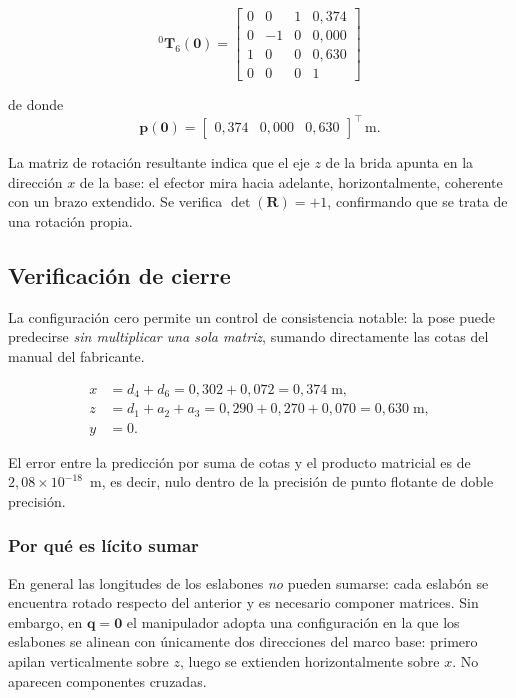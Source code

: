 \documentclass[11pt,a4paper]{article}
\newcommand{\T}[2]{{}^{#1}\mathbf{T}_{#2}}
\newcommand{\mat}[1]{\mathbf{#1}}
\begin{document}
\begin{equation}
\T{0}{6}(\mat{0}) =
\begin{bmatrix}
0 & 0 & 1 & 0{,}374\\
0 & -1 & 0 & 0{,}000\\
1 & 0 & 0 & 0{,}630\\
0 & 0 & 0 & 1
\end{bmatrix}
\end{equation}

de donde
\begin{equation}
\mat{p}(\mat{0}) = \begin{bmatrix}0{,}374 & 0{,}000 & 0{,}630\end{bmatrix}^{\top}\,\mathrm{m}.
\end{equation}

La matriz de rotación resultante indica que el eje $z$ de la brida
apunta en la dirección $x$ de la base: el efector mira hacia adelante,
horizontalmente, coherente con un brazo extendido. Se verifica
$\det(\mat{R}) = +1$, confirmando que se trata de una rotación propia.

\subsection{Verificación de cierre}
\label{sec:cierre}

La configuración cero permite un control de consistencia notable: la
pose puede predecirse \emph{sin multiplicar una sola matriz}, sumando
directamente las cotas del manual del fabricante.

\begin{align}
x &= d_4 + d_6 = 0{,}302 + 0{,}072 = 0{,}374\;\mathrm{m},\\
z &= d_1 + a_2 + a_3 = 0{,}290 + 0{,}270 + 0{,}070 = 0{,}630\;\mathrm{m},\\
y &= 0.
\end{align}

El error entre la predicción por suma de cotas y el producto matricial
es de $2{,}08\times10^{-18}$~m, es decir, nulo dentro de la precisión de
punto flotante de doble precisión.

\subsubsection*{Por qué es lícito sumar}

En general las longitudes de los eslabones \emph{no} pueden sumarse:
cada eslabón se encuentra rotado respecto del anterior y es necesario
componer matrices. Sin embargo, en $\mat{q} = \mat{0}$ el manipulador
adopta una configuración en la que los eslabones se alinean con
únicamente dos direcciones del marco base: primero apilan verticalmente
sobre $z$, luego se extienden horizontalmente sobre $x$. No aparecen
componentes cruzadas.
\end{document}
